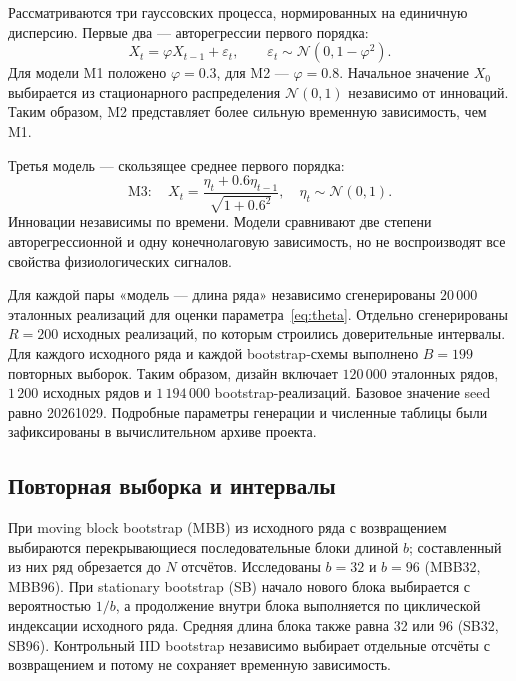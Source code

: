 Рассматриваются три гауссовских процесса, нормированных на единичную дисперсию. Первые два --- авторегрессии первого порядка:
\begin{equation}\label{eq:ar}
 X_t=\varphi X_{t-1}+\varepsilon_t,
 \qquad \varepsilon_t\sim\mathcal N(0,1-\varphi^2).
\end{equation}
Для модели M1 положено $\varphi=0.3$, для M2 --- $\varphi=0.8$. Начальное значение $X_0$ выбирается из стационарного распределения $\mathcal N(0,1)$ независимо от инноваций. Таким образом, M2 представляет более сильную временную зависимость, чем M1.

Третья модель --- скользящее среднее первого порядка:
\begin{equation}\label{eq:ma}
 \mathrm{M3}:\quad X_t=\frac{\eta_t+0.6\eta_{t-1}}
 {\sqrt{1+0.6^2}},\quad \eta_t\sim\mathcal N(0,1).
\end{equation}
Инновации независимы по времени. Модели сравнивают две степени авторегрессионной и одну конечнолаговую зависимость, но не воспроизводят все свойства физиологических сигналов.

Для каждой пары «модель --- длина ряда» независимо сгенерированы $20\,000$ эталонных реализаций для оценки параметра~\eqref{eq:theta}. Отдельно сгенерированы $R=200$ исходных реализаций, по которым строились доверительные интервалы. Для каждого исходного ряда и каждой bootstrap-схемы выполнено $B=199$ повторных выборок. Таким образом, дизайн включает $120\,000$ эталонных рядов, $1\,200$ исходных рядов и $1\,194\,000$ bootstrap-реализаций. Базовое значение seed равно 20261029. Подробные параметры генерации и численные таблицы были зафиксированы в вычислительном архиве проекта.

\subsection{Повторная выборка и интервалы}

При moving block bootstrap (MBB) из исходного ряда с возвращением выбираются перекрывающиеся последовательные блоки длиной $b$; составленный из них ряд обрезается до $N$ отсчётов. Исследованы $b=32$ и $b=96$ (MBB32, MBB96). При stationary bootstrap (SB) начало нового блока выбирается с вероятностью $1/b$, а продолжение внутри блока выполняется по циклической индексации исходного ряда. Средняя длина блока также равна 32 или 96 (SB32, SB96). Контрольный IID bootstrap независимо выбирает отдельные отсчёты с возвращением и потому не сохраняет временную зависимость.

